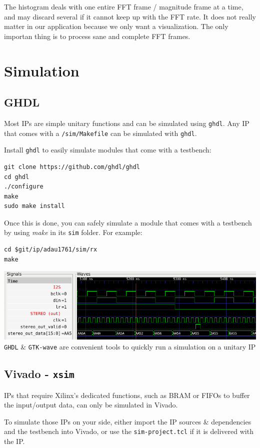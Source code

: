 \documentclass{article}
\begin{document}
The histogram deals with one entire FFT frame / magnitude frame
at a time, and may discard several if it cannot keep up with
the FFT rate. It does not really matter in our application
because we only want a visualization. The only
importan thing is to process sane and complete FFT frames.

\newpage
\section{Simulation}
\subsection{GHDL}

Most IPs are simple unitary functions
and can be simulated using {\tt ghdl}.
Any IP that comes with a {\tt /sim/Makefile}
can be simulated with {\tt ghdl}.

Install {\tt ghdl} to easily
simulate modules that come with a testbench:

\begin{verbatim}
git clone https://github.com/ghdl/ghdl
cd ghdl
./configure
make
sudo make install
\end{verbatim}

Once this is done, you can safely simulate a module
that comes with a testbench by using {\it make}
in its {\tt sim} folder.
For example:

\begin{verbatim}
cd $git/ip/adau1761/sim/rx
make
\end{verbatim}

\begin{center}
	\includegraphics[width=0.75\linewidth]{ghdl-gtkw.png} \\
	{\tt GHDL} \& {\tt GTK-wave} are convenient
	tools to quickly run a simulation on a unitary IP
\end{center}

\subsection{Vivado - {\tt xsim}}

IPs that require Xilinx's dedicated functions,
such as BRAM or FIFOs to buffer the input/output
data, can only be simulated in Vivado.

To simulate those IPs on your side, either
import the IP sources \& dependencies and the testbench
into Vivado, or use the {\tt sim-project.tcl} if
it is delivered with the IP.
\end{document}
